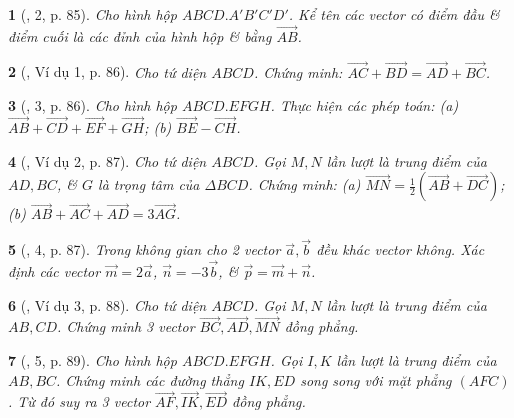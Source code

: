 \documentclass{article}
\newtheorem{baitoan}{}
\begin{document}
\begin{baitoan}[\cite{SGK_Toan_11_hinh_hoc_co_ban}, 2, p. 85]
	Cho hình hộp $ABCD.A'B'C'D'$. Kể tên các vector có điểm đầu \& điểm cuối là các đỉnh của hình hộp \& bằng $\overrightarrow{AB}$.
\end{baitoan}

\begin{baitoan}[\cite{SGK_Toan_11_hinh_hoc_co_ban}, Ví dụ 1, p. 86]
	Cho tứ diện $ABCD$. Chứng minh: $\overrightarrow{AC} + \overrightarrow{BD} = \overrightarrow{AD} + \overrightarrow{BC}$.
\end{baitoan}

\begin{baitoan}[\cite{SGK_Toan_11_hinh_hoc_co_ban}, 3, p. 86]
	Cho hình hộp $ABCD.EFGH$. Thực hiện các phép toán: (a) $\overrightarrow{AB} + \overrightarrow{CD} + \overrightarrow{EF} + \overrightarrow{GH}$; (b) $\overrightarrow{BE} - \overrightarrow{CH}$.
\end{baitoan}

\begin{baitoan}[\cite{SGK_Toan_11_hinh_hoc_co_ban}, Ví dụ 2, p. 87]
	Cho tứ diện $ABCD$. Gọi $M,N$ lần lượt là trung điểm của $AD,BC$, \& $G$ là trọng tâm của $\Delta BCD$. Chứng minh: (a) $\overrightarrow{MN} = \frac{1}{2}(\overrightarrow{AB} + \overrightarrow{DC})$; (b) $\overrightarrow{AB} + \overrightarrow{AC} + \overrightarrow{AD} = 3\overrightarrow{AG}$.
\end{baitoan}

\begin{baitoan}[\cite{SGK_Toan_11_hinh_hoc_co_ban}, 4, p. 87]
	Trong không gian cho 2 vector $\vec{a},\vec{b}$ đều khác vector không. Xác định các vector $\vec{m} = 2\vec{a}$, $\vec{n} = -3\vec{b}$, \& $\vec{p} = \vec{m} + \vec{n}$.
\end{baitoan}

\begin{baitoan}[\cite{SGK_Toan_11_hinh_hoc_co_ban}, Ví dụ 3, p. 88]
	Cho tứ diện $ABCD$. Gọi $M,N$ lần lượt là trung điểm của $AB,CD$. Chứng minh 3 vector $\overrightarrow{BC},\overrightarrow{AD},\overrightarrow{MN}$ đồng phẳng.
\end{baitoan}

\begin{baitoan}[\cite{SGK_Toan_11_hinh_hoc_co_ban}, 5, p. 89]
	Cho hình hộp $ABCD.EFGH$. Gọi $I,K$ lần lượt là trung điểm của $AB,BC$. Chứng minh các đường thẳng $IK,ED$ song song với mặt phẳng $(AFC)$. Từ đó suy ra 3 vector $\overrightarrow{AF},\overrightarrow{IK},\overrightarrow{ED}$ đồng phẳng.
\end{baitoan}
\end{document}
